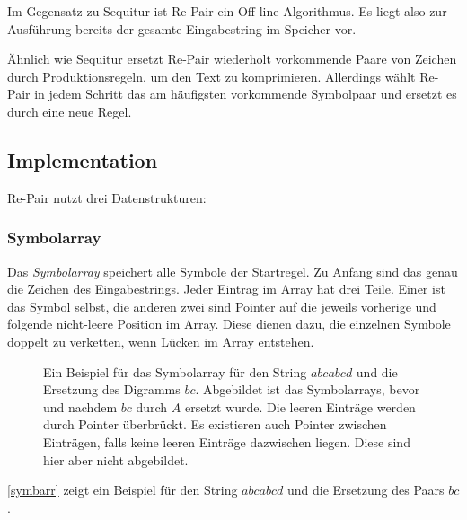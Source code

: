 Im Gegensatz zu Sequitur ist Re-Pair \cite{larsson_off-line_2000} ein Off-line Algorithmus. Es liegt also zur Ausführung bereits der gesamte Eingabestring im Speicher vor.

Ähnlich wie Sequitur ersetzt Re-Pair wiederholt vorkommende Paare von Zeichen durch Produktionsregeln, um den Text zu komprimieren. Allerdings wählt Re-Pair in jedem Schritt das am häufigsten vorkommende Symbolpaar und ersetzt es durch eine neue Regel.

\subsection{Implementation}

Re-Pair nutzt drei Datenstrukturen:

\subsubsection{Symbolarray}

Das \emph{Symbolarray} speichert alle Symbole der Startregel. Zu Anfang sind das genau die Zeichen des Eingabestrings. Jeder Eintrag im Array hat drei Teile. Einer ist das Symbol selbst, die anderen zwei sind Pointer auf die jeweils vorherige und folgende nicht-leere Position im Array. Diese dienen dazu, die einzelnen Symbole doppelt zu verketten, wenn Lücken im Array entstehen.
\begin{figure}
	\centering
	\caption{Ein Beispiel für das Symbolarray für den String $abcabcd$ und die Ersetzung des Digramms $bc$. Abgebildet ist das Symbolarrays, bevor und nachdem $bc$ durch $A$ ersetzt wurde. Die leeren Einträge werden durch Pointer überbrückt. Es existieren auch Pointer zwischen Einträgen, falls keine leeren Einträge dazwischen liegen. Diese sind hier aber nicht abgebildet.}
    \label{symbarr}
\end{figure}
\autoref{symbarr} zeigt ein Beispiel für den String $abcabcd$ und die Ersetzung des Paars $bc$.

